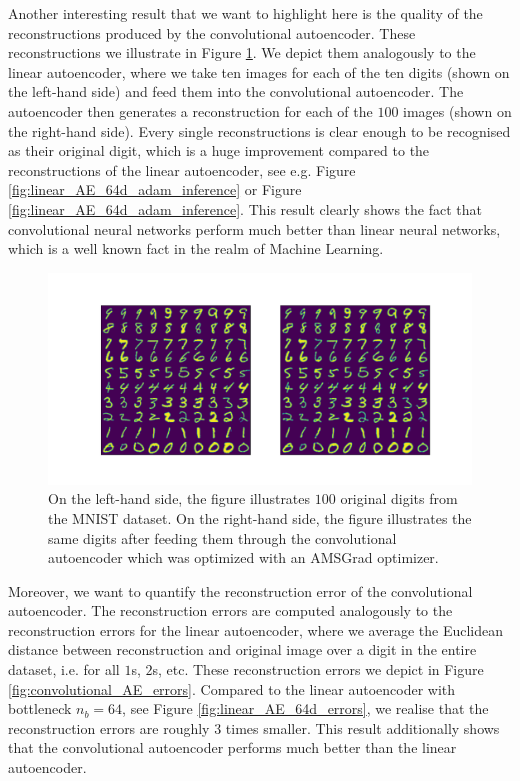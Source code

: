 Another interesting result that we want to highlight here is the quality of the reconstructions produced by the convolutional autoencoder. These reconstructions we illustrate in Figure \ref{fig:convolutional_AE_inference}. We depict them analogously to the linear autoencoder, where we take ten images for each of the ten digits (shown on the left-hand side) and feed them into the convolutional autoencoder. The autoencoder then generates a reconstruction for each of the $100$ images (shown on the right-hand side). Every single reconstructions is clear enough to be recognised as their original digit, which is a huge improvement compared to the reconstructions of the linear autoencoder, see e.g. Figure \ref{fig:linear_AE_64d_adam_inference} or Figure \ref{fig:linear_AE_64d_adam_inference}. This result clearly shows the fact that convolutional neural networks perform much better than linear neural networks, which is a well known fact in the realm of Machine Learning.

\begin{figure}
\begin{center}
      \includegraphics[trim = 15mm 10mm 15mm 15mm, clip, width=\linewidth]{convolutional_AE_inference}
\end{center}
\caption{On the left-hand side, the figure illustrates $100$ original digits from the MNIST dataset. On the right-hand side, the figure illustrates the same digits after feeding them through the convolutional autoencoder which was optimized with an AMSGrad optimizer.}\label{fig:convolutional_AE_inference}
\end{figure}

Moreover, we want to quantify the reconstruction error of the convolutional autoencoder. The reconstruction errors are computed analogously to the reconstruction errors for the linear autoencoder, where we average the Euclidean distance between reconstruction and original image over a digit in the entire dataset, i.e. for all $1$s, $2$s, etc. These reconstruction errors we depict in Figure \ref{fig:convolutional_AE_errors}. Compared to the linear autoencoder with bottleneck $n_b=64$, see Figure \ref{fig:linear_AE_64d_errors}, we realise that the reconstruction errors are roughly $3$ times smaller. This result additionally shows that the convolutional autoencoder performs much better than the linear autoencoder.

